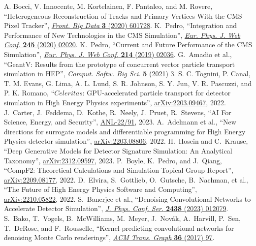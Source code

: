 \begin{thebibliography}{99}
 A. Bocci, V. Innocente, M. Kortelainen, F. Pantaleo, and M. Rovere, ``Heterogeneous Reconstruction of Tracks and Primary Vertices With the CMS Pixel Tracker'', \href{https://doi.org/10.3389/fdata.2020.601728}{\textit{Front. Big Data} \textbf{3} (2020) 601728}.
 K.~Pedro, ``Integration and Performance of New Technologies in the CMS Simulation'', \href{https://doi.org/10.1051/epjconf/202024502020}{\textit{Eur. Phys. J. Web Conf.} \textbf{245} (2020) 02020}.
 K.~Pedro, ``Current and Future Performance of the CMS Simulation'', \href{https://doi.org/10.1051/epjconf/201921402036}{\textit{Eur. Phys. J. Web Conf.} \textbf{214} (2019) 02036}.
 G.~Amadio et al., ``GeantV: Results from the prototype of concurrent vector particle transport simulation in HEP'', \href{https://doi.org/10.1007/s41781-020-00048-6}{\textit{Comput. Softw. Big Sci.} \textbf{5} (2021) 3}.
 S. C. Tognini, P. Canal, T. M. Evans, G. Lima, A. L. Lund, S. R. Johnson, S. Y. Jun, V. R. Pascuzzi, and P. K. Romano, ``$Celeritas$: GPU-accelerated particle transport for detector simulation in High Energy Physics experiments'', \href{https://arxiv.org/abs/2203.09467}{arXiv:2203.09467}, 2022.
 J.~Carter, J.~Feddema, D.~Kothe, R.~Neely, J.~Pruet, R.~Stevens, ``AI For Science, Energy, and Security'', \href{https://www.anl.gov/ai-for-science-report}{ANL-22/91}, 2023.
 A.~Adelmann et al., ``New directions for surrogate models and differentiable programming for High Energy Physics detector simulation'', \href{https://arxiv.org/abs/2203.08806}{arXiv:2203.08806}, 2022.
 H.~Hosein and C.~Krause, ``Deep Generative Models for Detector Signature Simulation: An Analytical Taxonomy'', \href{https://arxiv.org/abs/2312.09597}{arXiv:2312.09597}, 2023.
 P.~Boyle, K.~Pedro, and J.~Qiang, ``CompF2: Theoretical Calculations and Simulation Topical Group Report'', \href{https://arxiv.org/abs/2209.08177}{arXiv:2209.08177}, 2022.
 D.~Elvira, S.~Gottlieb, O.~Gutsche, B.~Nachman, et al., ``The Future of High Energy Physics Software and Computing'', \href{https://arxiv.org/abs/2210.05822}{arXiv:2210.05822}, 2022.
 S.~Banerjee et al., ``Denoising Convolutional Networks to Accelerate Detector Simulation'', \href{https://doi.org/10.1088/1742-6596/2438/1/012079}{\textit{J. Phys. Conf. Ser.} \textbf{2438} (2023) 012079}.
 S.~Bako, T.~Vogels, B.~McWilliams, M.~Meyer, J.~Nov\'ak, A.~Harvill, P.~Sen, T.~DeRose, and F.~Rousselle, ``Kernel-predicting convolutional networks for denoising Monte Carlo renderings'', \href{https://doi.org/10.1145/3072959.3073708}{\textit{ACM Trans. Graph} \textbf{36} (2017) 97}.

\end{thebibliography}
